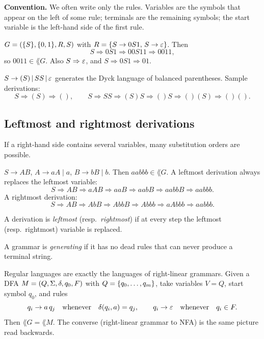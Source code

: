 \textbf{Convention.} We often write only the rules. Variables are the symbols
that appear on the left of some rule; terminals are the remaining symbols;
the start variable is the left-hand side of the first rule.

\begin{example}
$G=(\{S\},\{0,1\},R,S)$ with $R=\{S\to 0S1,\,S\to\varepsilon\}$. Then
\[
  S\Rightarrow 0S1\Rightarrow 00S11\Rightarrow 0011,
\]
so $0011\in\lang{G}$. Also $S\Rightarrow\varepsilon$, and
$S\Rightarrow 0S1\Rightarrow 01$.
\end{example}

\begin{example}
$S\to(S)\,|\,SS\,|\,\varepsilon$ generates the Dyck language of balanced parentheses.
Sample derivations:
\[
  S\Rightarrow(S)\Rightarrow(),
  \qquad
  S\Rightarrow SS\Rightarrow(S)S\Rightarrow()S\Rightarrow()(S)\Rightarrow()().
\]
\end{example}

\subsection{Leftmost and rightmost derivations}
If a right-hand side contains several variables, many substitution orders are
possible.

\begin{example}
$S\to AB$, $A\to aA\mid a$, $B\to bB\mid b$. Then $aabbb\in\lang{G}$.
A leftmost derivation always replaces the leftmost variable:
\[
  S\Rightarrow AB\Rightarrow aAB\Rightarrow aaB\Rightarrow aabB\Rightarrow aabbB\Rightarrow aabbb.
\]
A rightmost derivation:
\[
  S\Rightarrow AB\Rightarrow AbB\Rightarrow AbbB\Rightarrow Abbb\Rightarrow aAbbb\Rightarrow aabbb.
\]
\end{example}

\begin{definition}
A derivation is \emph{leftmost} (resp.\ \emph{rightmost}) if at every step the
leftmost (resp.\ rightmost) variable is replaced.
\end{definition}

A grammar is \emph{generating} if it has no dead rules that can never produce
a terminal string.

Regular languages are exactly the languages of right-linear grammars.
Given a DFA $M=(Q,\Sigma,\delta,q_0,F)$ with $Q=\{q_0,\ldots,q_m\}$,
take variables $V=Q$, start symbol $q_0$, and rules
\[
  q_i\to a\,q_j
  \quad\text{whenever}\quad
  \delta(q_i,a)=q_j,
  \qquad
  q_i\to\varepsilon
  \quad\text{whenever}\quad
  q_i\in F.
\]
Then $\lang{G}=\lang{M}$. The converse (right-linear grammar to NFA) is the
same picture read backwards.

